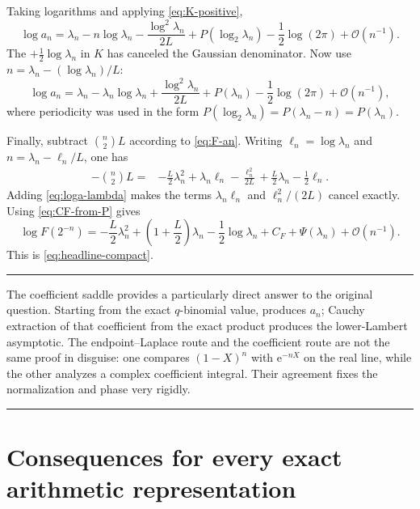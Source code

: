 \documentclass[11pt,oneside]{article}
\theoremstyle{definition}
\theoremstyle{remark}
\newcommand{\e}{\mathrm e}
\newcommand{\bigO}{\mathcal O}
\newenvironment{boxedremark}{%
  \par\smallskip\noindent\begin{center}\begin{minipage}{0.94\textwidth}%
  \color{black}\hrule\vspace{0.6em}\small
}{%
  \vspace{0.6em}\hrule\end{minipage}\end{center}\smallskip
}
\begin{document}
Taking logarithms and applying \eqref{eq:K-positive},
\begin{equation}
 \log a_n=\lambda_n-n\log\lambda_n
 -\frac{\log^2\lambda_n}{2L}
 +P(\log_2\lambda_n)-\frac12\log(2\pi)
 +\bigO(n^{-1}).                                            \label{eq:loga-pre}
\end{equation}
The $+\tfrac12\log\lambda_n$ in $K$ has canceled the Gaussian denominator.  Now use
$n=\lambda_n-(\log\lambda_n)/L$:
\begin{equation}
 \log a_n=\lambda_n-\lambda_n\log\lambda_n
 +\frac{\log^2\lambda_n}{2L}
 +P(\lambda_n)-\frac12\log(2\pi)
 +\bigO(n^{-1}),                                            \label{eq:loga-lambda}
\end{equation}
where periodicity was used in the form
$P(\log_2\lambda_n)=P(\lambda_n-n)=P(\lambda_n)$.

Finally, subtract $\binom n2L$ according to \eqref{eq:F-an}.  Writing
$\ell_n=\log\lambda_n$ and $n=\lambda_n-\ell_n/L$, one has
\begin{align*}
 -\binom n2L
 ={}&-\frac L2\lambda_n^2+\lambda_n\ell_n
 -\frac{\ell_n^2}{2L}+\frac L2\lambda_n-\frac12\ell_n.
\end{align*}
Adding \eqref{eq:loga-lambda} makes the terms
$\lambda_n\ell_n$ and $\ell_n^2/(2L)$ cancel exactly.  Using
\eqref{eq:CF-from-P} gives
\begin{equation}
 \log F(2^{-n})=
 -\frac L2\lambda_n^2+
 \left(1+\frac L2\right)\lambda_n-\frac12\log\lambda_n
 +C_F+\Psi(\lambda_n)+\bigO(n^{-1}).                        \label{eq:saddle-final}
\end{equation}
This is \eqref{eq:headline-compact}.

\begin{boxedremark}
The coefficient saddle provides a particularly direct answer to the original question.
Starting from the exact $q$-binomial value,  produces $a_n$; Cauchy
extraction of that coefficient from the exact product produces the lower-Lambert asymptotic.
The endpoint--Laplace route and the coefficient route are not the same proof in disguise:
one compares $(1-X)^n$ with $\e^{-nX}$ on the real line, while the other analyzes a complex
coefficient integral.  Their agreement fixes the normalization and phase very rigidly.
\end{boxedremark}

\section{Consequences for every exact arithmetic representation}
\label{sec:corollaries}
\end{document}
